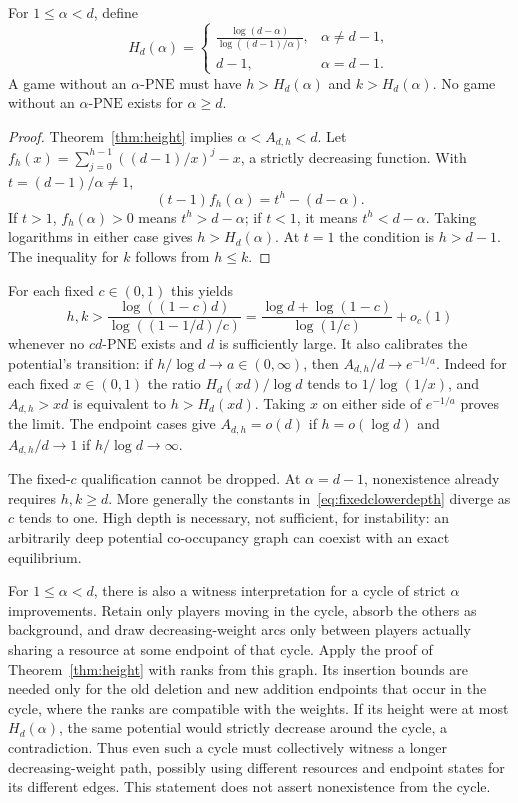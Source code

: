 \documentclass[manuscript,review,anonymous]{acmart}
\newcommand{\PNE}{\mathrm{PNE}}
\begin{document}
\begin{theorem}\label{thm:depthnecessary}
For $1\le\alpha<d$, define
\begin{equation}\label{eq:depthinverse}
 H_d(\alpha)=
 \begin{cases}
 \displaystyle\frac{\log(d-\alpha)}{\log((d-1)/\alpha)},&\alpha\ne d-1,\\[5pt]
 d-1,&\alpha=d-1.
 \end{cases}
\end{equation}
A game without an $\alpha$-$\PNE$ must have $h>H_d(\alpha)$ and $k>H_d(\alpha)$. No game without an $\alpha$-$\PNE$ exists for $\alpha\ge d$.
\end{theorem}
\begin{proof}
Theorem~\ref{thm:height} implies $\alpha<A_{d,h}<d$. Let $f_h(x)=\sum_{j=0}^{h-1}((d-1)/x)^j-x$, a strictly decreasing function. With $t=(d-1)/\alpha\ne1$,
\[
 (t-1)f_h(\alpha)=t^h-(d-\alpha).
\]
If $t>1$, $f_h(\alpha)>0$ means $t^h>d-\alpha$; if $t<1$, it means $t^h<d-\alpha$. Taking logarithms in either case gives $h>H_d(\alpha)$. At $t=1$ the condition is $h>d-1$. The inequality for $k$ follows from $h\le k$.
\end{proof}
For each fixed $c\in(0,1)$ this yields
\begin{equation}\label{eq:fixedclowerdepth}
 h,k>\frac{\log((1-c)d)}{\log((1-1/d)/c)}
 =\frac{\log d+\log(1-c)}{\log(1/c)}+o_c(1)
\end{equation}
whenever no $cd$-$\PNE$ exists and $d$ is sufficiently large. It also calibrates the potential's transition: if $h/\log d\to a\in(0,\infty)$, then $A_{d,h}/d\to e^{-1/a}$. Indeed for each fixed $x\in(0,1)$ the ratio $H_d(xd)/\log d$ tends to $1/\log(1/x)$, and $A_{d,h}>xd$ is equivalent to $h>H_d(xd)$. Taking $x$ on either side of $e^{-1/a}$ proves the limit. The endpoint cases give $A_{d,h}=o(d)$ if $h=o(\log d)$ and $A_{d,h}/d\to1$ if $h/\log d\to\infty$.

The fixed-$c$ qualification cannot be dropped. At $\alpha=d-1$, nonexistence already requires $h,k\ge d$. More generally the constants in~\eqref{eq:fixedclowerdepth} diverge as $c$ tends to one. High depth is necessary, not sufficient, for instability: an arbitrarily deep potential co-occupancy graph can coexist with an exact equilibrium.

For $1\le\alpha<d$, there is also a witness interpretation for a cycle of strict $\alpha$ improvements. Retain only players moving in the cycle, absorb the others as background, and draw decreasing-weight arcs only between players actually sharing a resource at some endpoint of that cycle. Apply the proof of Theorem~\ref{thm:height} with ranks from this graph. Its insertion bounds are needed only for the old deletion and new addition endpoints that occur in the cycle, where the ranks are compatible with the weights. If its height were at most $H_d(\alpha)$, the same potential would strictly decrease around the cycle, a contradiction. Thus even such a cycle must collectively witness a longer decreasing-weight path, possibly using different resources and endpoint states for its different edges. This statement does not assert nonexistence from the cycle.
\end{document}
